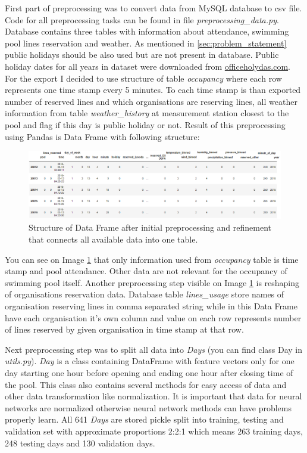 \documentclass{article}
\begin{document}
First part of preprocessing was to convert data from MySQL database to csv file. Code for all preprocessing tasks can be found in file \emph{preprocessing\_data.py}. Database contains three tables with information about attendance, swimming pool lines reservation and weather. As mentioned in \ref{sec:problem_statement} public holidays should be also used but are not present in database. Public holiday dates for all years in dataset were downloaded from \href{https://www.officeholidays.com/countries/czech-republic}{officeholydas.com}. For the export I decided to use structure of table \emph{occupancy} where each row represents one time stamp every 5 minutes. To each time stamp is than exported number of reserved lines and which organisations are reserving lines, all weather information from table \emph{weather\_history} at measurement station closest to the pool and flag if this day is public holiday or not. Result of this preprocessing using Pandas is Data Frame with following structure:

\begin{figure}[h!]
\centering
\includegraphics[width=16cm]{imgs/dataframe_head}
\caption{Structure of Data Frame after initial preprocessing and refinement that connects all available data into one table.}
\label{fig:dataframe_structure}
\end{figure}

You can see on Image \ref{fig:dataframe_structure} that only information used from \emph{occupancy} table is time stamp and pool attendance. Other data are not relevant for the occupancy of swimming pool itself. Another preprocessing step visible on Image \ref{fig:dataframe_structure} is reshaping of organisations reservation data. Database table \emph{lines\_usage} store names of organisation reserving lines in comma separated string while in this Data Frame have each organisation it's own column and value on each row represents number of lines reserved by given organisation in time stamp at that row. 

Next preprocessing step was to split all data into \emph{Days} (you can find class Day in \emph{utils.py}). \emph{Day} is a class containing DataFrame with feature vectors only for one day starting one hour before opening and ending one hour after closing time of the pool. This class also contains several methods for easy access of data and other data transformation like normalization. It is important that data for neural networks are normalized otherwise neural network methods can have problems properly learn. All 641 \emph{Days} are stored pickle split into training, testing and validation set with approximate proportions 2:2:1 which means 263 training days, 248 testing days and 130 validation days.
\end{document}
